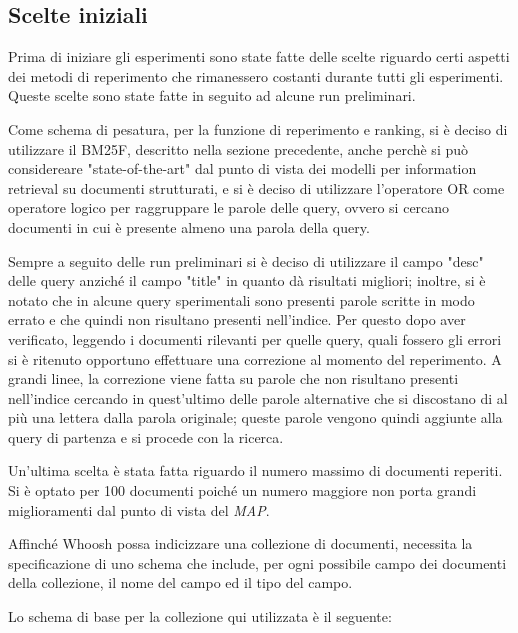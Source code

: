 \documentclass[runningheads]{llncs}
\begin{document}
\subsection{Scelte iniziali}

Prima di iniziare gli esperimenti sono state fatte delle scelte riguardo certi aspetti dei metodi di reperimento che rimanessero costanti durante tutti gli esperimenti.
Queste scelte sono state fatte in seguito ad alcune run preliminari.

Come schema di pesatura, per la funzione di reperimento e ranking,  si \`e deciso di utilizzare il BM25F, descritto nella sezione precedente, anche perch\`e si pu\`o considereare "state-of-the-art" dal punto di vista dei modelli per information retrieval su documenti strutturati, e si \`e deciso di utilizzare l'operatore OR come operatore logico per raggruppare le parole delle query, ovvero si cercano documenti in cui \`e presente almeno una parola della query.

Sempre a seguito delle run preliminari si \`e deciso di utilizzare il campo "desc" delle query anzich\'e il campo "title" in quanto d\`a risultati migliori; inoltre, si \`e notato che in alcune query sperimentali sono presenti parole scritte in modo errato e che quindi non risultano presenti nell'indice.
Per questo dopo aver verificato, leggendo i documenti rilevanti per quelle query, quali fossero gli errori si \`e ritenuto opportuno effettuare una correzione al momento del reperimento.
A grandi linee, la correzione viene fatta su parole che non risultano presenti nell'indice cercando in quest'ultimo delle parole alternative che si discostano di al pi\`u una lettera dalla parola originale; queste parole vengono quindi aggiunte alla query di partenza e si procede con la ricerca.

Un'ultima scelta \`e stata fatta riguardo il numero massimo di documenti reperiti.
Si \`e optato per 100 documenti poich\'e un numero maggiore non porta grandi miglioramenti dal punto di vista del \textit{MAP}. \par

Affinch\'e Whoosh possa indicizzare una collezione di documenti, necessita la
specificazione di uno schema che include, per ogni possibile campo dei documenti della collezione, il nome del campo ed il tipo del campo.

Lo schema di base per la collezione qui utilizzata \`e il seguente:
\par
\end{document}
